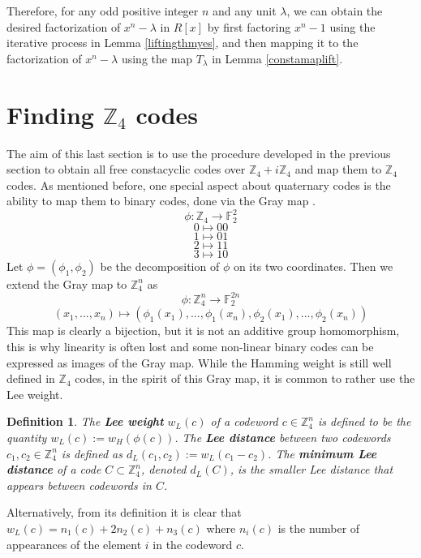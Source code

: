 \documentclass[a4paper, 12pt]{amsart}
\newtheorem{defn}[lemma]{Definition}
\theoremstyle{definition}
\newcommand{\F}{{\mathbb F}}
\newcommand{\Z}{{\mathbb Z}}
\newcommand{\lm}{\lambda}
\numberwithin{equation}{section}
\numberwithin{table}{section}
\begin{document}
Therefore, for any odd positive integer $n$ and any unit $\lm$, we can obtain the desired factorization of $x^n-\lm$ in $R[x]$ by first factoring $x^n-1$ using the iterative process  in Lemma \ref{liftingthmyes}, and then mapping it to the factorization of $x^n-\lm$ using the map $T_{\lm}$ in Lemma \ref{constamaplift}.

\section{Finding $\Z_4$ codes}\label{sec: findings}

The aim of this last section is to use the procedure developed in the previous section to obtain all free constacyclic codes over $\Z_4 + i \Z_4$ and map them to $\Z_4$ codes. As mentioned before, one special aspect about quaternary codes is the ability to map them to binary codes, done via the Gray map \cite{wan1997quaternary}.
\[ \phi: \Z_4 \to \F_2^2\]
\[0 \mapsto 00\]
\[1 \mapsto 01\]
\[2 \mapsto 11\]
\[3 \mapsto 10\]
Let $\phi = (\phi_1, \phi_2)$ be the decomposition of $\phi$ on its two coordinates. Then we extend the Gray map to $\Z_4^n$ as
\[\phi :\Z_4^n \to \F_2^{2n}\]
\[(x_1,...,x_n) \mapsto (\phi_1(x_1),...,\phi_1(x_n),\phi_2(x_1),...,\phi_2(x_n))\]
This map is clearly a bijection, but it is not an additive group homomorphism, this is why linearity is often lost and some non-linear binary codes can be expressed as images of the Gray map.
While the Hamming weight is still well defined in $\Z_4$ codes, in the spirit of this Gray map, it is common to rather use the Lee weight.

\begin{defn}
    The \textbf{Lee weight} $w_L(c)$ of a codeword $c \in \Z_4^n$ is defined to be the quantity $w_L(c) := w_H(\phi(c))$. The \textbf{Lee distance} between two codewords $c_1,c_2 \in \Z_4^n$ is defined as $d_L(c_1,c_2) := w_L(c_1-c_2)$. The \textbf{minimum Lee distance} of a code $C \subset \Z_4^n$, denoted $d_L(C)$, is the smaller Lee distance that appears between codewords in $C$.
\end{defn}

Alternatively, from its definition it is clear that $w_L(c) = n_1(c) +2n_2(c) + n_3(c)$ where $n_i(c)$ is the number of appearances of the element $i$ in the codeword $c$.
\end{document}
